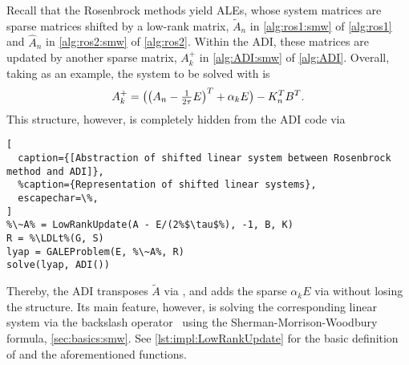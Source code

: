 Recall that the Rosenbrock methods yield \acp{ALE},
whose system matrices are sparse matrices shifted by a low-rank matrix,
\cf $\tilde A_n$ in \autoref{alg:ros1:smw} of \autoref{alg:ros1} and $\hat A_n$ in \autoref{alg:ros2:smw} of \autoref{alg:ros2}.
Within the \ac{ADI}, these matrices are updated by another sparse matrix,
\cf $A^+_k$ in \autoref{alg:ADI:smw} of \autoref{alg:ADI}.
Overall, taking  as an example,
the system to be solved with is
\begin{equation}
  A_k^+ =
  \big(\big( A_n - \tfrac{1}{2\tau} E \big)^T + \alpha_k E \big) - K_n^T B^T
  .
\end{equation}
This structure, however, is completely hidden from the \ac{ADI} code via
\begin{lstlisting}[
  caption={[Abstraction of shifted linear system between Rosenbrock method and ADI]},
  %caption={Representation of shifted linear systems},
  escapechar=\%,
]
%\~A% = LowRankUpdate(A - E/(2%$\tau$%), -1, B, K)
R = %\LDLt%(G, S)
lyap = GALEProblem(E, %\~A%, R)
solve(lyap, ADI())
\end{lstlisting}
Thereby, the \ac{ADI} transposes $\tilde A$ via ,
and adds the sparse $\alpha_k E$ via \julia{(+)} without losing the  structure.
Its main feature, however, is solving the corresponding linear system via the backslash operator~\julia{(\textbackslash)}
using the Sherman-Morrison-Woodbury formula,
\cf \autoref{sec:basics:smw}.
See \autoref{lst:impl:LowRankUpdate} for the basic definition of  and the aforementioned functions.

